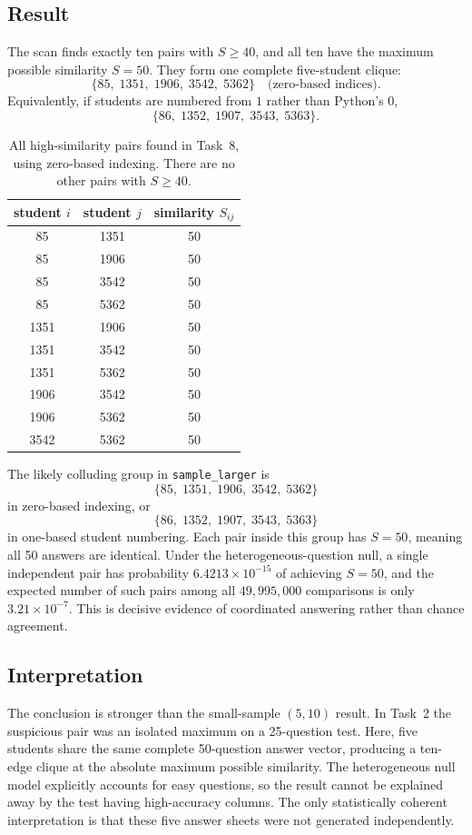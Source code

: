 \documentclass[11pt,a4paper]{article}
\begin{document}
\subsection{Result}
The scan finds exactly ten pairs with $S\geq40$, and all ten have the
maximum possible similarity $S=50$. They form one complete five-student
clique:
\[
  \{85,\;1351,\;1906,\;3542,\;5362\}
  \quad\text{(zero-based indices).}
\]
Equivalently, if students are numbered from $1$ rather than Python's
$0$,
\[
  \{86,\;1352,\;1907,\;3543,\;5363\}.
\]

\begin{table}[htb]
  \centering
  \begin{tabular}{c c c}
    \toprule
    student $i$ & student $j$ & similarity $S_{ij}$ \\
    \midrule
    85 & 1351 & 50 \\
    85 & 1906 & 50 \\
    85 & 3542 & 50 \\
    85 & 5362 & 50 \\
    1351 & 1906 & 50 \\
    1351 & 3542 & 50 \\
    1351 & 5362 & 50 \\
    1906 & 3542 & 50 \\
    1906 & 5362 & 50 \\
    3542 & 5362 & 50 \\
    \bottomrule
  \end{tabular}
  \caption{All high-similarity pairs found in Task~8, using zero-based
  indexing. There are no other pairs with $S\geq40$.}
  \label{tab:T8-pairs}
\end{table}

\begin{keyresult}
The likely colluding group in \texttt{sample\_larger} is
\[
  \boxed{\{85,\;1351,\;1906,\;3542,\;5362\}}
\]
in zero-based indexing, or
\[
  \boxed{\{86,\;1352,\;1907,\;3543,\;5363\}}
\]
in one-based student numbering. Each pair inside this group has
$S=50$, meaning all 50 answers are identical. Under the
heterogeneous-question null, a single independent pair has probability
$6.4213\times10^{-15}$ of achieving $S=50$, and the expected number of
such pairs among all $49{,}995{,}000$ comparisons is only
$3.21\times10^{-7}$. This is decisive evidence of coordinated
answering rather than chance agreement.
\end{keyresult}

\subsection{Interpretation}
The conclusion is stronger than the small-sample $(5,10)$ result. In
Task~2 the suspicious pair was an isolated maximum on a 25-question
test. Here, five students share the same complete 50-question answer
vector, producing a ten-edge clique at the absolute maximum possible
similarity. The heterogeneous null model explicitly accounts for easy
questions, so the result cannot be explained away by the test having
high-accuracy columns. The only statistically coherent interpretation is
that these five answer sheets were not generated independently.
\end{document}
